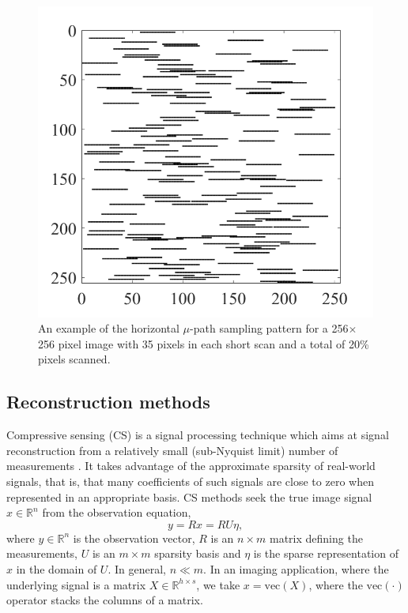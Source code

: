 \documentclass[twocolumn,oneside]{IEEEtran/IEEEtran}
\begin{document}
\begin{figure}
  \centering
  \includegraphics[width=0.7\columnwidth]{figures-SBA/random_mask.pdf}
  \caption{An example of the horizontal $\mu$-path sampling pattern for a 256$\times$256 pixel image with 35 pixels in each short scan and a total of 20\% pixels scanned.}
  \label{fig:mu_mask}
\end{figure}
\subsection{Reconstruction methods}
\label{sec:reconstructionMethods}
Compressive sensing (CS) is a signal processing technique which aims at signal reconstruction from a
relatively small (sub-Nyquist limit) number of measurements
\cite{carmi2014compressive}. It takes advantage of the approximate sparsity of
real-world signals, that is, that many coefficients of such signals
are close to zero when represented in an appropriate basis. CS methods seek the
true image signal $x\in\mathbb{R}^n$ from the observation equation,
\begin{equation}\label{op:observation}
  y = R x = RU\eta,
\end{equation}
\noindent where $y\in\mathbb{R}^n$ is the observation vector, $R$ is an
$n\times m$ matrix defining the measurements, $U$ is an $m\times m$ sparsity
basis and $\eta$ is the sparse representation of $x$ in the domain of $U$. In
general, $n\ll m$. In an imaging application, where the underlying signal is a
matrix $X\in\mathbb{R}^{h\times s}$, we take $x=\text{vec}(X)$, where the
$\text{vec}(\cdot)$ operator stacks the columns of a matrix.
\end{document}
